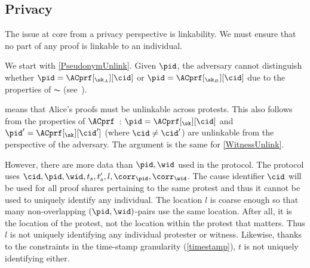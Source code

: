 \subsection{Privacy}

The issue at core from a privacy perspective is linkability.
We must ensure that no part of any proof is linkable to an individual.

We start with \cref{PseudonymUnlink}.
Given \(\pid\), the adversary cannot distinguish whether \(\pid = 
  \ACprf[_{\sk_A}][\cid]\) or \(\pid = \ACprf[_{\sk_B}][\cid]\) due to the 
properties of \(\AC\) (see~\cite{HowToWinTheCloneWars}).

 means that Alice's proofs must be unlinkable across 
protests.
This also follows from the properties of 
\(\ACprf\)~\cite{HowToWinTheCloneWars}: \(\pid =  \ACprf[_{\sk}][\cid]\) and 
\(\pid' = \ACprf[_{\sk}][\cid']\) (where \(\cid \neq \cid'\)) are unlinkable 
from the perspective of the adversary.
The argument is the same for \cref{WitnessUnlink}.

However, there are more data than \(\pid, \wid\) used in the protocol.
The protocol uses \(\cid, \pid, \wid, t_s, t_s', l, \corr_\pid, \corr_\wid\).
The cause identifier \(\cid\) will be used for all proof shares
pertaining to the same protest and thus it cannot be used to uniquely
identify any individual. The location \(l\) is coarse enough so that many non-overlapping 
\((\pid, \wid)\)-pairs use the same location.
After all, it is the location of the protest, not the location within the 
protest that matters.
Thus \(l\) is not uniquely identifying any individual protester or witness.
Likewise, thanks to the constraints in the time-stamp granularity 
(\cref{timestamp}), \(t\) is not uniquely identifying either.

